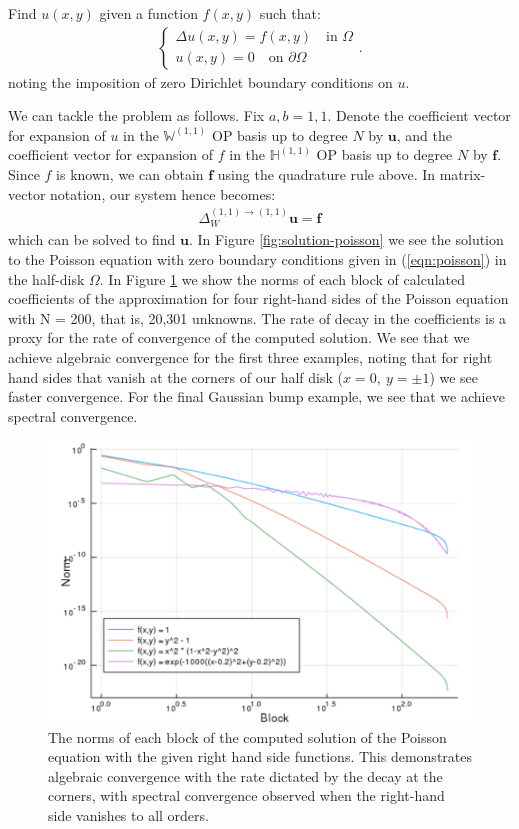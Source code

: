 \documentclass[11pt, oneside]{article}   	%
\newcommand{\hdop}{H}
\newcommand{\bighdopii}{{\mathbb{\hdop}^{(1,1)}}}
\newcommand{\laplacewii}{\Delta_W^{(1,1)\to(1,1)}}
\newcommand{\bigWii}{{\mathbb{W}^{(1,1)}}}
\begin{document}
Find \(u(x,y)\) given a function \(f(x,y)\) such that:
\begin{align}
	\begin{cases}
    		\Delta u(x,y) = f(x,y) \quad \text{in } \Omega \\
		u(x,y) = 0 \quad \text{on } \partial \Omega
	\end{cases}.
	\label{eqn:poisson}
\end{align}
noting the imposition of zero Dirichlet boundary conditions on $u$.

We can tackle the problem as follows. Fix \(a, b = 1,1\). Denote the coefficient vector for expansion of $u$ in the $\bigWii$ OP basis up to degree $N$ by $\mathbf{u}$, and the coefficient vector for expansion of $f$ in the $\bighdopii$ OP basis up to degree $N$ by $\mathbf{f}$. Since $f$ is known, we can obtain $\mathbf{f}$ using the quadrature rule above. In matrix-vector notation, our system hence becomes:
\begin{align*}
    \laplacewii \mathbf{u} = \mathbf{f}
\end{align*}
which can be solved to find $\mathbf{u}$.
In Figure \ref{fig:solution-poisson} we see the solution to the Poisson equation with zero boundary conditions given in (\ref{eqn:poisson}) in the half-disk $\Omega$. In Figure \ref{fig:solutionblocknorms} we show the norms of each block of calculated coefficients of the approximation for four right-hand sides of the Poisson equation with N = 200, that is, 20,301 unknowns. The rate of decay in the coefficients is a proxy for the rate of convergence of the computed solution. We see that we achieve algebraic convergence for the first three examples, noting that for right hand sides that vanish at the corners of our half disk ($x=0, \: y = \pm 1$) we see faster convergence. For the final Gaussian bump example, we see that we achieve spectral convergence.

\begin{figure}
        	\includegraphics[scale=0.5]{solutionblocknorms}
	\centering
	\caption{The norms of each block of the computed solution of the Poisson equation with the given right hand side functions. This demonstrates algebraic convergence with the rate dictated by the decay at the corners, with spectral convergence observed when the right-hand side vanishes to all orders.}
        	\label{fig:solutionblocknorms}
\end{figure}
\end{document}

